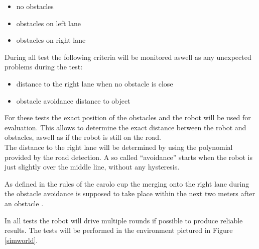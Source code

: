 \begin{itemize}
	\item no obstacles
	\item obstacles on left lane
	\item obstacles on right lane
\end{itemize}

During all test the following criteria will be monitored aswell as any unexpected problems during the test:

\begin{itemize}
	\item distance to the right lane when no obstacle is close
	\item obstacle avoidance distance to object
\end{itemize}

For these tests the exact position of the obstacles and the robot will be used for evaluation. This allows to determine the exact distance between the robot and obstacles, aswell as if the robot is still on the road.\\
The distance to the right lane will be determined by using the polynomial provided by the road detection. A so called ``avoidance'' starts when the robot is just slightly over the middle line, without any hysteresis.

As defined in the rules of the carolo cup the merging onto the right lane during the obstacle avoidance is supposed to take place within the next two meters after an obstacle \cite{carolocup}.

In all tests the robot will drive multiple rounds if possible to produce reliable results. The tests will be performed in the environment pictured in Figure \ref{simworld}.\\












